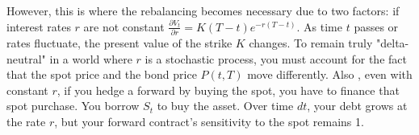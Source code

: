 \documentclass[12pt,a4paper]{exam}
\begin{document}
\begin{questions}
\begin{solution}
\begin{parts}
		However, this is where the rebalancing becomes necessary due to two factors: if interest rates $r$ are not constant $
		\frac{\partial V_t}{\partial r}=K(T-t)e^{-r(T-t)}$.
		As time $t$ passes or rates fluctuate, the present value of the strike $K$ changes. To remain truly "delta-neutral" in a world where $r$ is a stochastic process, you must account for the fact that the spot price and the bond price $P(t,T)$ move differently.
		Also , even with constant $r$, if you hedge a forward by buying the spot, you have to finance that spot purchase.
		You borrow $S_t$ to buy the asset. Over time $dt$, your debt grows at the rate $r$, but your forward contract's sensitivity to the spot remains 1.
	\end{parts}
\end{solution}



\end{questions}
\end{document}
